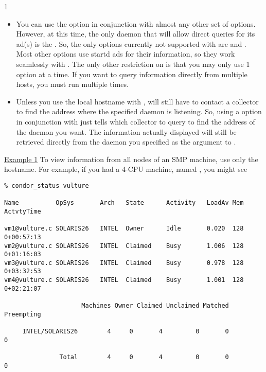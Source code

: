 \begin{ManPage}{\label{man-condor-status}}{1}
\begin{itemize}
	\item You can use the  option in conjunction with
	almost any other set of options.
	However, at this time, the only daemon that will allow direct
	queries for its ad(s) is the .
	So, the only options currently not supported with
	 are  and .
	Most other options use startd ads for their information, so
	they work seamlessly with .
	The only other restriction on  is that you may
	only use 1  option at a time.
	If you want to query information directly from multiple hosts,
	you must run  multiple times.

	\item Unless you use the local hostname with ,
	 will still have to contact a collector to find
	the address where the specified daemon is listening.
	So, using a  option in conjunction with
	 just tells  which collector to
	query to find the address of the daemon you want.
	The information actually displayed will still be retrieved
	directly from the daemon you specified as the argument to
	.

\end{itemize}

\Examples

\underline{Example 1} To view information from all nodes of an SMP
machine, use only the hostname.
For example, if you had a 4-CPU machine, named
, you might see
\footnotesize
\begin{verbatim}
% condor_status vulture

Name          OpSys       Arch   State      Activity   LoadAv Mem   ActvtyTime

vm1@vulture.c SOLARIS26   INTEL  Owner      Idle       0.020  128   0+00:57:13
vm2@vulture.c SOLARIS26   INTEL  Claimed    Busy       1.006  128   0+01:16:03
vm3@vulture.c SOLARIS26   INTEL  Claimed    Busy       0.978  128   0+03:32:53
vm4@vulture.c SOLARIS26   INTEL  Claimed    Busy       1.001  128   0+02:21:07

                     Machines Owner Claimed Unclaimed Matched Preempting

     INTEL/SOLARIS26        4     0       4         0       0          0

               Total        4     0       4         0       0          0
\end{verbatim}
\normalsize



\end{ManPage}
